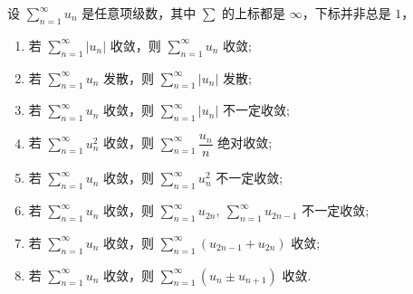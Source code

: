 \begin{theorem}
    设 $\displaystyle\sum_{n=1}^{\infty}u_n$ 是任意项级数，其中 $\sum$ 的上标都是 $\infty$，下标并非总是 $1$，
    \begin{enumerate}[label=(\arabic{*})]
        \item 若 $\displaystyle \sum_{n=1}^{\infty}|u_n|$ 收敛，则 $\displaystyle\sum_{n=1}^{\infty}u_n$ 收敛; 
        \item 若 $\displaystyle\sum_{n=1}^{\infty}u_n$ 发散，则 $\displaystyle\sum_{n=1}^{\infty}|u_n|$ 发散;
        \item 若 $\displaystyle\sum_{n=1}^{\infty}u_n$ 收敛，则 $\displaystyle\sum_{n=1}^{\infty}|u_n|$ 不一定收敛;
        \item 若 $\displaystyle\sum_{n=1}^{\infty}u^2_n$ 收敛，则 $\displaystyle\sum_{n=1}^{\infty}\dfrac{u_n}{n}$ 绝对收敛;
        \item 若 $\displaystyle\sum_{n=1}^{\infty}u_n$ 收敛，则 $\displaystyle\sum_{n=1}^{\infty}u^2_n$ 不一定收敛;
        \item 若 $\displaystyle\sum_{n=1}^{\infty}u_n$ 收敛，则 $\displaystyle\sum_{n=1}^{\infty}u_{2n},~\displaystyle\sum_{n=1}^{\infty}u_{2n-1}$ 不一定收敛;
        \item 若 $\displaystyle\sum_{n=1}^{\infty}u_n$ 收敛，则 $\displaystyle\sum_{n=1}^{\infty}(u_{2n-1}+u_{2n})$ 收敛;
        \item 若 $\displaystyle\sum_{n=1}^{\infty}u_n$ 收敛，则 $\displaystyle\sum_{n=1}^{\infty}(u_{n}\pm u_{n+1})$ 收敛.
    \end{enumerate}
\end{theorem}


